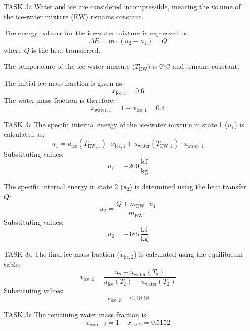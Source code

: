 TASK 3a  
Water and ice are considered incompressible, meaning the volume of the ice-water mixture (EW) remains constant.  

The energy balance for the ice-water mixture is expressed as:  
\[
\Delta E = m \cdot (u_2 - u_1) = Q
\]  
where \( Q \) is the heat transferred.  

The temperature of the ice-water mixture (\( T_{\text{EW}} \)) is \( 0^\circ\text{C} \) and remains constant.  

The initial ice mass fraction is given as:  
\[
x_{\text{ice},1} = 0.6
\]  
The water mass fraction is therefore:  
\[
x_{\text{water},1} = 1 - x_{\text{ice},1} = 0.4
\]  

TASK 3c  
The specific internal energy of the ice-water mixture in state 1 (\( u_1 \)) is calculated as:  
\[
u_1 = u_{\text{ice}}(T_{\text{EW},1}) \cdot x_{\text{ice},1} + u_{\text{water}}(T_{\text{EW},1}) \cdot x_{\text{water},1}
\]  
Substituting values:  
\[
u_1 = -200 \, \frac{\text{kJ}}{\text{kg}}
\]  

The specific internal energy in state 2 (\( u_2 \)) is determined using the heat transfer \( Q \):  
\[
u_2 = \frac{Q + m_{\text{EW}} \cdot u_1}{m_{\text{EW}}}
\]  
Substituting values:  
\[
u_2 = -185 \, \frac{\text{kJ}}{\text{kg}}
\]  

TASK 3d  
The final ice mass fraction (\( x_{\text{ice},2} \)) is calculated using the equilibrium table:  
\[
x_{\text{ice},2} = \frac{u_2 - u_{\text{water}}(T_2)}{u_{\text{ice}}(T_2) - u_{\text{water}}(T_2)}
\]  
Substituting values:  
\[
x_{\text{ice},2} = 0.4848
\]  

TASK 3e  
The remaining water mass fraction is:  
\[
x_{\text{water},2} = 1 - x_{\text{ice},2} = 0.5152
\]